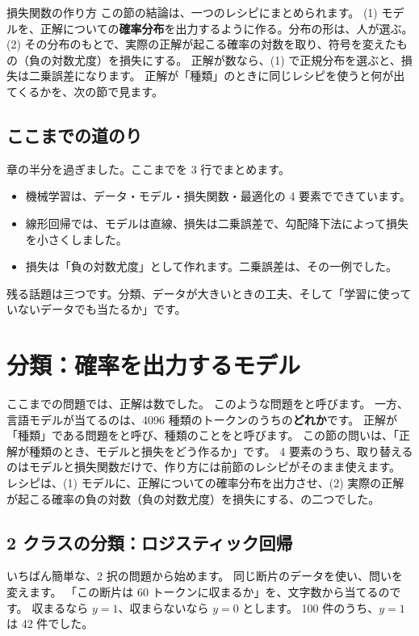 \begin{intuition}{損失関数の作り方}
この節の結論は、一つのレシピにまとめられます。
(1) モデルを、正解についての\textbf{確率分布}を出力するように作る。分布の形は、人が選ぶ。
(2) その分布のもとで、実際の正解が起こる確率の対数を取り、符号を変えたもの（負の対数尤度）を損失にする。
正解が数なら、(1) で正規分布を選ぶと、損失は二乗誤差になります。
正解が「種類」のときに同じレシピを使うと何が出てくるかを、次の節で見ます。
\end{intuition}

\subsection*{ここまでの道のり}

章の半分を過ぎました。ここまでを 3 行でまとめます。
\begin{itemize}
\item 機械学習は、データ・モデル・損失関数・最適化の 4 要素でできています。
\item 線形回帰では、モデルは直線、損失は二乗誤差で、勾配降下法によって損失を小さくしました。
\item 損失は「負の対数尤度」として作れます。二乗誤差は、その一例でした。
\end{itemize}
残る話題は三つです。分類、データが大きいときの工夫、そして「学習に使っていないデータでも当たるか」です。

\section{分類：確率を出力するモデル}\label{sec:ml-classification}

ここまでの問題では、正解は数でした。
このような問題をと呼びます。
一方、言語モデルが当てるのは、4096 種類のトークンのうちの\textbf{どれか}です。
正解が「種類」である問題をと呼び、種類のことをと呼びます。
この節の問いは、「正解が種類のとき、モデルと損失をどう作るか」です。
4 要素のうち、取り替えるのはモデルと損失関数だけで、作り方には前節のレシピがそのまま使えます。
レシピは、(1) モデルに、正解についての確率分布を出力させ、(2) 実際の正解が起こる確率の負の対数（負の対数尤度）を損失にする、の二つでした。

\subsection*{2 クラスの分類：ロジスティック回帰}

いちばん簡単な、2 択の問題から始めます。
同じ断片のデータを使い、問いを変えます。
「この断片は 60 トークンに収まるか」を、文字数から当てるのです。
収まるなら $y=1$、収まらないなら $y=0$ とします。
100 件のうち、$y=1$ は 42 件でした。

